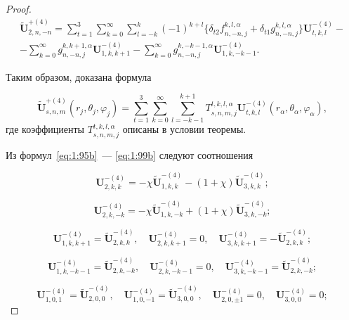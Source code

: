 \begin{russian}
\begin{proof}
\begin{multline}
\mathbf{\tilde U}_{2,n,-n}^{+(4)}=\sum\limits_{t=1}^3\sum\limits_{k=0}^\infty\sum\limits_{l=-k}^{k}(-1)^{k+l}\bigg\{\delta_{t2}{f}_{n,-n,j}^{k,l,\alpha}+\delta_{t1}{g}_{n,-n,j}^{k,l,\alpha}\bigg\}\mathbf{U}_{t,k,l}^{-(4)}- \\
-\sum\limits_{k=0}^\infty{g}_{n,-n,j}^{k,k+1,\alpha}\mathbf{U}_{1,k,k+1}^{-(4)}-\sum\limits_{k=0}^\infty{g}_{n,-n,j}^{k,-k-1,\alpha}\mathbf{U}_{1,k,-k-1}^{-(4)}.
\label{eq:1:113r}
\end{multline}

Таким образом, доказана формула

\begin{equation}
\mathbf{\tilde U}_{s,n,m}^{+(4)}(r_j,\theta_j,\varphi_j)=\sum\limits_{t=1}^3\sum\limits_{k=0}^\infty\sum\limits_{l=-k-1}^{k+1}T_{s,n,m,j}^{t,k,l,\alpha}\mathbf{U}_{t,k,l}^{-(4)}(r_\alpha,\theta_\alpha,\varphi_\alpha),
\label{eq:1:114r}
\end{equation}
где коэффициенты $T_{s,n,m,j}^{t,k,l,\alpha}$ описаны в условии теоремы.

Из формул~\eqref{eq:1:95b}~--- \eqref{eq:1:99b} следуют соотношения

\begin{equation}
\mathbf{U}_{2,k,k}^{-(4)}=-\chi\mathbf{\tilde U}_{1,k,k}^{-(4)}-(1+\chi)\mathbf{\tilde U}_{3,k,k}^{-(4)};
\label{eq:1:115r}
\end{equation}

\begin{equation}
\mathbf{U}_{2,k,-k}^{-(4)}=-\chi\mathbf{\tilde U}_{1,k,-k}^{-(4)}+(1+\chi)\mathbf{\tilde U}_{3,k,-k}^{-(4)};
\label{eq:1:116r}
\end{equation}

\begin{equation}
\mathbf{U}_{1,k,k+1}^{-(4)}=\mathbf{\tilde U}_{2,k,k}^{-(4)},\quad\mathbf{U}_{2,k,k+1}^{-(4)}=0,\quad\mathbf{U}_{3,k,k+1}^{-(4)}=-\mathbf{\tilde U}_{2,k,k}^{-(4)};
\label{eq:1:117r}
\end{equation}

\begin{equation}
\mathbf{U}_{1,k,-k-1}^{-(4)}=\mathbf{\tilde U}_{2,k,-k}^{-(4)},\quad\mathbf{U}_{2,k,-k-1}^{-(4)}=0,\quad\mathbf{U}_{3,k,-k-1}^{-(4)}=\mathbf{\tilde U}_{2,k,-k}^{-(4)};
\label{eq:1:118r}
\end{equation}

\begin{equation}
\mathbf{U}_{1,0,1}^{-(4)}=\mathbf{\tilde U}_{2,0,0}^{-(4)},\quad\mathbf{U}_{1,0,-1}^{-(4)}=\mathbf{\tilde U}_{3,0,0}^{-(4)},\quad\mathbf{U}_{2,0,\pm 1}^{-(4)}=0,\quad\mathbf{U}_{3,0,0}^{-(4)}=0;
\label{eq:1:119r}
\end{equation}


\end{proof}
\end{russian}
